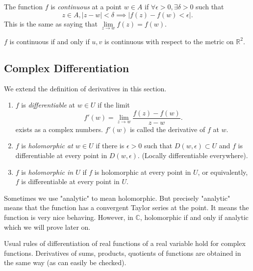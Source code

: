\begin{definition}
    The function \(f\) is \textit{continuous} at a point \(w \in A\) if \(\forall \epsilon > 0, \exists \delta > 0\) such that
    \[
        z \in A, \left\vert z - w \right\vert <\delta \implies \left\vert f(z)-f(w) < \epsilon \right\vert.
    \]
    This is the same as saying that \(\lim\limits_{z \to w} f(z)=f(w)\).
\end{definition}
\begin{remark}
    \(f\) is continuous if and only if \(u,v\) is continuous with respect to the metric on \(\mathbb{R}^2\).
\end{remark}

\subsection{Complex Differentiation}
We extend the definition of derivatives in this section.
\begin{definition}
    \begin{enumerate}
        We have below some definitions of differentiation in \(\mathbb{C}\) .
        \item \(f\) is \textit{differentiable} at \(w \in U\) if the limit
        \[
            f'(w)=\lim\limits_{z \to w}\frac{f(z)-f(w)}{z-w}.
        \]
        exists as a complex numbers. \(f'(w)\) is called the derivative of \(f\) at \(w\).
        \item \(f\) is \textit{holomorphic at \(w \in U\)} if there is \(\epsilon>0\) such that \(D(w, \epsilon) \subset U\) and \(f\) is differentiable at every point in \(D(w, \epsilon)\). (Locally differentiable everywhere).
        \item \(f\)  is \textit{holomorphic in \(U\)} if \(f\) is holomorphic at every point in \(U\), or equivalently, \(f\) is differentiable at every point in \(U\).
    \end{enumerate}
\end{definition}
\begin{remark}
    Sometimes we use "analytic" to mean holomorphic. But precisely "analytic" means that the function has a convergent Taylor series at the point. It means the function is very nice behaving. However, in \(\mathbb{C}\), holomorphic if and only if analytic which we will prove later on.
\end{remark}
Usual rules of differentiation of real functions of a real variable hold for complex functions. Derivatives of sums, products, quotients of functions are obtained in the same way (as can easily be checked).

